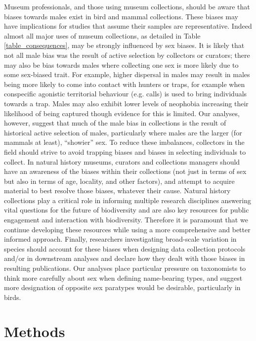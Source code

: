 \documentclass[a4paper, 12pt]{article}
\begin{document}
Museum professionals, and those using museum collections, should be aware that biases towards males exist in bird and mammal collections. 
These biases may have implications for studies that assume their samples are representative. Indeed almost all major uses of museum collections, as detailed in Table \ref{table_consequences}, may be strongly influenced by sex biases. 
It is likely that not all male bias was the result of active selection by collectors or curators; there may also be bias towards males where collecting one sex is more likely due to some sex-biased trait. 
For example, higher dispersal in males may result in males being more likely to come into contact with hunters or traps, for example when conspecific agonistic territorial behaviour (e.g. calls) is used to bring individuals towards a trap. 
Males may also exhibit lower levels of neophobia increasing their likelihood of being captured though evidence for this is limited\cite{crane2017patterns,laviola1992sexual}. 
Our analyses, however, suggest that much of the male bias in collections is the result of historical active selection of males, particularly where males are the larger (for mammals at least), ``showier'' sex. 
To reduce these imbalances, collectors in the field should strive to avoid trapping biases and biases in selecting individuals to collect. 
In natural history museums, curators and collections managers should have an awareness of the biases within their collections (not just in terms of sex but also in terms of age, locality, and other factors), and attempt to acquire material to best resolve those biases, whatever their cause. 
Natural history collections play a critical role in informing multiple research disciplines answering vital questions for the future of biodiversity\cite{meineke2018biological} and are also key resources for public engagement and interaction with biodiversity\cite{machin2008}. 
Therefore it is paramount that we continue developing these resources while using a more comprehensive and better informed approach. 
Finally, researchers investigating broad-scale variation in species should account for these biases when designing data collection protocols and/or in downstream analyses and declare how they dealt with those biases in resulting publications. 
Our analyses place particular pressure on taxonomists to think more carefully about sex when defining name-bearing types, and suggest more designation of opposite sex paratypes would be desirable, particularly in birds. 


\section{Methods}
\end{document}
